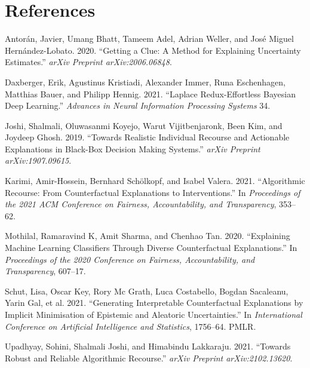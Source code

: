 \documentclass[
]{acmconf}
\newlength{\cslhangindent}
\newlength{\cslentryspacingunit} %
\newenvironment{CSLReferences}[2] %
 {%
  \setlength{\parindent}{0pt}
  \ifodd #1
  \let\oldpar\par
  \def\par{\hangindent=\cslhangindent\oldpar}
  \fi
  \setlength{\parskip}{#2\cslentryspacingunit}
 }%
 {}
\begin{document}
\hypertarget{references}{%
\section*{References}\label{references}}

\hypertarget{refs}{}
\begin{CSLReferences}{1}{0}
\leavevmode{}%
Antorán, Javier, Umang Bhatt, Tameem Adel, Adrian Weller, and José
Miguel Hernández-Lobato. 2020. {``Getting a Clue: A Method for
Explaining Uncertainty Estimates.''} \emph{arXiv Preprint
arXiv:2006.06848}.

\leavevmode{}%
Daxberger, Erik, Agustinus Kristiadi, Alexander Immer, Runa Eschenhagen,
Matthias Bauer, and Philipp Hennig. 2021. {``Laplace Redux-Effortless
Bayesian Deep Learning.''} \emph{Advances in Neural Information
Processing Systems} 34.

\leavevmode{}%
Joshi, Shalmali, Oluwasanmi Koyejo, Warut Vijitbenjaronk, Been Kim, and
Joydeep Ghosh. 2019. {``Towards Realistic Individual Recourse and
Actionable Explanations in Black-Box Decision Making Systems.''}
\emph{arXiv Preprint arXiv:1907.09615}.

\leavevmode{}%
Karimi, Amir-Hossein, Bernhard Schölkopf, and Isabel Valera. 2021.
{``Algorithmic Recourse: From Counterfactual Explanations to
Interventions.''} In \emph{Proceedings of the 2021 ACM Conference on
Fairness, Accountability, and Transparency}, 353--62.

\leavevmode{}%
Mothilal, Ramaravind K, Amit Sharma, and Chenhao Tan. 2020.
{``Explaining Machine Learning Classifiers Through Diverse
Counterfactual Explanations.''} In \emph{Proceedings of the 2020
Conference on Fairness, Accountability, and Transparency}, 607--17.

\leavevmode{}%
Schut, Lisa, Oscar Key, Rory Mc Grath, Luca Costabello, Bogdan
Sacaleanu, Yarin Gal, et al. 2021. {``Generating Interpretable
Counterfactual Explanations by Implicit Minimisation of Epistemic and
Aleatoric Uncertainties.''} In \emph{International Conference on
Artificial Intelligence and Statistics}, 1756--64. PMLR.

\leavevmode{}%
Upadhyay, Sohini, Shalmali Joshi, and Himabindu Lakkaraju. 2021.
{``Towards Robust and Reliable Algorithmic Recourse.''} \emph{arXiv
Preprint arXiv:2102.13620}.


\end{CSLReferences}
\end{document}
